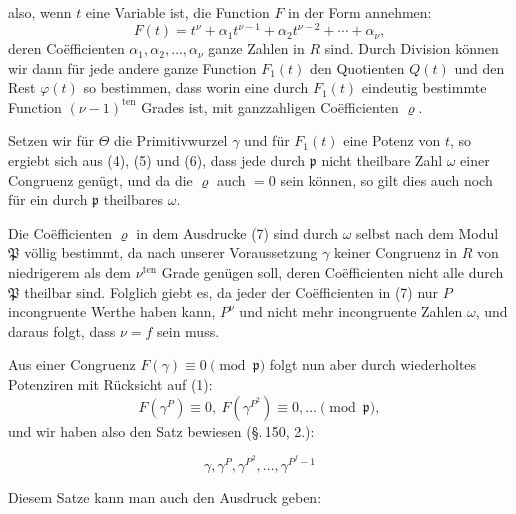 also, wenn $t$ eine Variable ist, die Function $F$ in der Form annehmen:
\[
F(t) = t^\nu + \alpha_1 t^{\nu-1} + \alpha_2 t^{\nu-2} + \cdots + \alpha_\nu,
\]
deren Coëfficienten $\alpha_1, \alpha_2, \ldots, \alpha_\nu$ ganze Zahlen in $R$ sind. Durch Division können wir dann für jede andere ganze Function $F_1(t)$ den Quotienten $Q(t)$ und den Rest $\varphi(t)$ so bestimmen, dass
worin
eine durch $F_1(t)$ eindeutig bestimmte Function $(\nu-1)^{\text{ten}}$ Grades ist, mit ganzzahligen Coëfficienten $\varrho$.

Setzen wir für $\Theta$ die Primitivwurzel $\gamma$ und für $F_1(t)$ eine Potenz von $t$, so ergiebt sich aus (4), (5) und (6), dass jede durch $\mathfrak{p}$ nicht theilbare Zahl $\omega$ einer Congruenz
genügt, und da die $\varrho$ auch $= 0$ sein können, so gilt dies auch noch für ein durch $\mathfrak{p}$ theilbares $\omega$.

Die Coëfficienten $\varrho$ in dem Ausdrucke (7) sind durch $\omega$ selbst nach dem Modul $\mathfrak{P}$ völlig bestimmt, da nach unserer Voraussetzung $\gamma$ keiner Congruenz in $R$ von niedrigerem als dem $\nu^{\text{ten}}$ Grade genügen soll, deren Coëfficienten nicht alle durch $\mathfrak{P}$ theilbar sind. Folglich giebt es, da jeder der Coëfficienten in (7) nur $P$ incongruente Werthe haben kann, $P^\nu$ und nicht mehr incongruente Zahlen $\omega$, und daraus folgt, dass $\nu = f$ sein muss.

Aus einer Congruenz $F(\gamma) \equiv 0 \pmod{\mathfrak{p}}$ folgt nun aber durch wiederholtes Potenziren mit Rücksicht auf (1):
\[
F(\gamma^P) \equiv 0, \ F(\gamma^{P^2}) \equiv 0, \ldots \pmod{\mathfrak{p}},
\]
und wir haben also den Satz bewiesen (\S.\,150, 2.):

\[
\gamma, \gamma^P, \gamma^{P^2}, \ldots, \gamma^{P^f-1}
\]

Diesem Satze kann man auch den Ausdruck geben:

